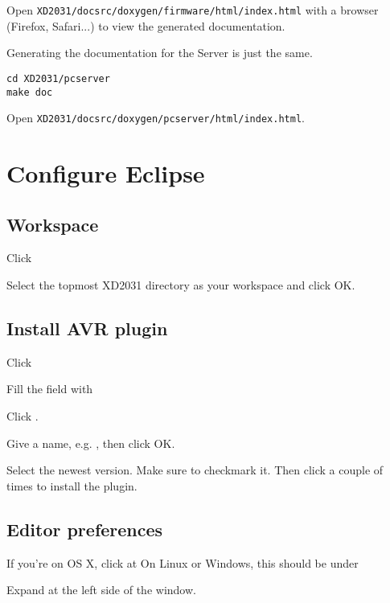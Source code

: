 Open \texttt{XD2031/docsrc/doxygen/firmware/html/index.html}
with a browser (Firefox, Safari...) to view the generated documentation.

Generating the documentation for the Server is just the same.

\begin{verbatim}
cd XD2031/pcserver
make doc
\end{verbatim}

Open \texttt{XD2031/docsrc/doxygen/pcserver/html/index.html}.


\clearpage
\section{Configure Eclipse}
\subsection{Workspace}
Click 

Select the topmost XD2031 directory as your workspace and click OK.


\clearpage
\subsection{Install AVR plugin}
Click 

Fill the field  with 

Click .


\clearpage
Give a name, e.g. , then click OK.

Select the newest version. Make sure to checkmark it. Then click 
a couple of times to install the plugin.

\clearpage
\subsection{Editor preferences}
If you're on OS X, click at  
On Linux or Windows, this should be under

Expand  at the left side of the window.

